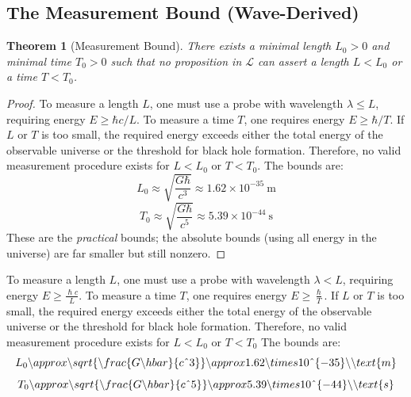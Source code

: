\documentclass[aps,preprint,showpacs,showkeys]{revtex4}
\newtheorem{theorem}{Theorem}
\begin{document}
\subsection{The Measurement Bound (Wave-Derived)}

\begin{theorem}[Measurement Bound]
There exists a minimal length $L_0 > 0$ and minimal time $T_0 > 0$ such that
no proposition in $\mathcal{L}$ can assert a length $L < L_0$ or a time $T <
T_0$.
\end{theorem}

\begin{proof}
To measure a length $L$, one must use a probe with wavelength $\lambda \le L$, requiring energy $E \ge \hbar c/L$. To measure a time $T$, one requires energy $E \ge \hbar/T$. If $L$ or $T$ is too small, the required energy exceeds either the total energy of the observable universe or the threshold for black hole formation. Therefore, no valid measurement procedure exists for $L < L_0$ or $T < T_0$. The bounds are:
\begin{equation}
L_0 \approx \sqrt{\frac{G\hbar}{c^3}} \approx 1.62 \times 10^{-35}\ \text{m}
\end{equation}
\begin{equation}
T_0 \approx \sqrt{\frac{G\hbar}{c^5}} \approx 5.39 \times 10^{-44}\ \text{s}
\end{equation}
These are the \emph{practical} bounds; the absolute bounds (using all energy in the universe) are far smaller but still nonzero.
\end{proof}

To measure a length $L$, one must use a probe with wavelength $\lambda <L$,
requiring energy $E\geq \frac{\hslash c}{L}$. To measure a time $T$, one
requires energy $E\geq \frac{\hslash }{T}$. If $L$ or $T$ is too small, the
required energy exceeds either the total energy of the observable universe
or the threshold for black hole formation. Therefore, no valid measurement
procedure exists for $L<L_{0}$  or $T<T_{0}$ The bounds are:%
\begin{equation}
L_{0}\backslash approx\backslash sqrt\{\backslash frac\{G\backslash hbar\}\{c%
\symbol{94}3\}\}\backslash approx1.62\backslash times10\symbol{94}%
\{-35\}\backslash \backslash text\{m\}
\end{equation}%
\begin{equation}
T_{0}\backslash approx\backslash sqrt\{\backslash frac\{G\backslash hbar\}\{c%
\symbol{94}5\}\}\backslash approx5.39\backslash times10\symbol{94}%
\{-44\}\backslash \backslash text\{s\}
\end{equation}
\end{document}
